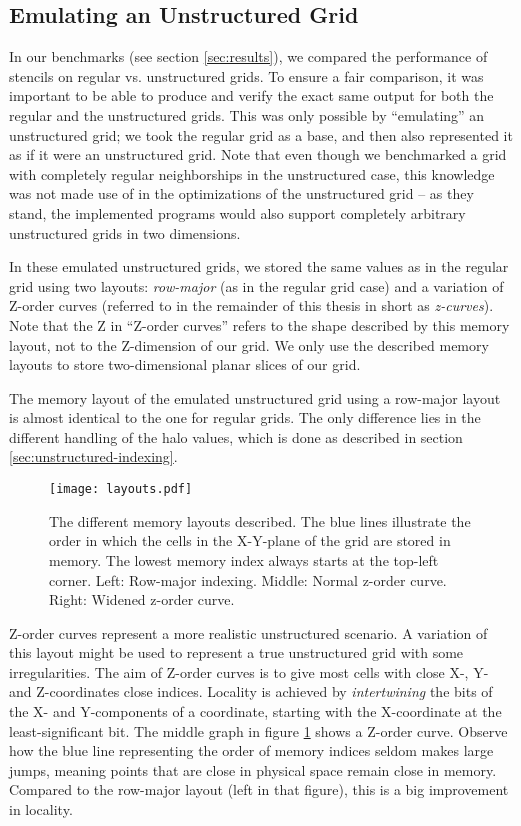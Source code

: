 \subsection{Emulating an Unstructured Grid} \label{sec:emulating}

In our benchmarks (see section \ref{sec:results}), we compared the performance of stencils on regular vs. unstructured grids. To ensure a fair comparison, it was important to be able to produce and verify the exact same output for both the regular and the unstructured grids. This was only possible by ``emulating'' an unstructured grid; we took the regular grid as a base, and then also represented it as if it were an unstructured grid. Note that even though we benchmarked a grid with completely regular neighborships in the unstructured case, this knowledge was not made use of in the optimizations of the unstructured grid -- as they stand, the implemented programs would also support completely arbitrary unstructured grids in two dimensions.

In these emulated unstructured grids, we stored the same values as in the regular grid using two layouts: \emph{row-major} (as in the regular grid case) and a variation of Z-order curves (referred to in the remainder of this thesis in short as \emph{z-curves}). Note that the Z in ``Z-order curves'' refers to the shape described by this memory layout, not to the Z-dimension of our grid. We only use the described memory layouts to store two-dimensional planar slices of our grid.

The memory layout of the emulated unstructured grid using a row-major layout is almost identical to the one for regular grids. The only difference lies in the different handling of the halo values, which is done as described in section \ref{sec:unstructured-indexing}. 

\begin{figure}
    \texttt{[image: layouts.pdf]}
    \caption{\label{fig:layouts} The different memory layouts described. The blue lines illustrate the order in which the cells in the X-Y-plane of the grid are stored in memory. The lowest memory index always starts at the top-left corner. Left: Row-major indexing. Middle: Normal z-order curve. Right: Widened z-order curve.}
\end{figure}

Z-order curves\cite{wiki:z-curves} represent a more realistic unstructured scenario. A variation of this layout might be used to represent a true unstructured grid with some irregularities. The aim of Z-order curves is to give most cells with close X-, Y- and Z-coordinates close indices. Locality is achieved by \emph{intertwining} the bits of the X- and Y-components of a coordinate, starting with the X-coordinate at the least-significant bit. The middle graph in figure \ref{fig:layouts} shows a Z-order curve. Observe how the blue line representing the order of memory indices seldom makes large jumps, meaning points that are close in physical space remain close in memory. Compared to the row-major layout (left in that figure), this is a big improvement in locality.

